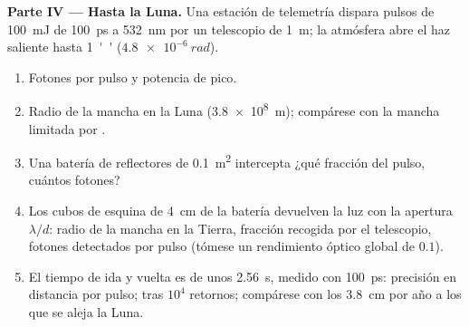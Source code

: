 \begin{problem}
\textbf{Parte IV --- Hasta la Luna.}
Una estación de telemetría dispara pulsos de \qty{100}{mJ} de \qty{100}{ps} a
\qty{532}{nm} por un telescopio de \qty{1}{m}; la atmósfera abre
el haz saliente hasta \qty{1}{''} ($\qty{4.8e-6}{rad}$).
\begin{enumerate}[resume]
  \item Fotones por pulso y potencia de pico.
  \item Radio de la mancha en la Luna (\qty{3.8e8}{m}); compárese con la
        mancha limitada por .
  \item Una batería de reflectores de \qty{0.1}{m^2} intercepta ¿qué fracción
        del pulso, cuántos fotones?
  \item Los cubos de esquina de \qty{4}{cm} de la batería devuelven la luz con la
        apertura $\lambda/d$: radio de la mancha en la Tierra, fracción recogida por el
        telescopio, fotones detectados por pulso (tómese un rendimiento
        óptico global de $0.1$).
  \item El tiempo de ida y vuelta es de unos \qty{2.56}{s}, medido con
        \qty{100}{ps}: precisión en distancia por pulso; tras $10^4$
        retornos; compárese con los \qty{3.8}{cm} por año a los que
        se aleja la Luna.
\end{enumerate}
\end{problem}
